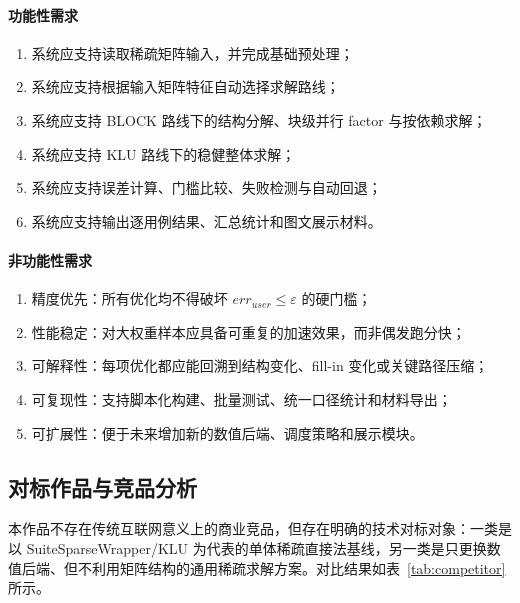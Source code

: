 \documentclass[12pt,a4paper,fontset=none]{ctexart}
\begin{document}
\paragraph{功能性需求}
\begin{enumerate}
  \item 系统应支持读取稀疏矩阵输入，并完成基础预处理；
  \item 系统应支持根据输入矩阵特征自动选择求解路线；
  \item 系统应支持 BLOCK 路线下的结构分解、块级并行 factor 与按依赖求解；
  \item 系统应支持 KLU 路线下的稳健整体求解；
  \item 系统应支持误差计算、门槛比较、失败检测与自动回退；
  \item 系统应支持输出逐用例结果、汇总统计和图文展示材料。
\end{enumerate}

\paragraph{非功能性需求}
\begin{enumerate}
  \item 精度优先：所有优化均不得破坏 $err_{user}\le\varepsilon$ 的硬门槛；
  \item 性能稳定：对大权重样本应具备可重复的加速效果，而非偶发跑分快；
  \item 可解释性：每项优化都应能回溯到结构变化、fill-in 变化或关键路径压缩；
  \item 可复现性：支持脚本化构建、批量测试、统一口径统计和材料导出；
  \item 可扩展性：便于未来增加新的数值后端、调度策略和展示模块。
\end{enumerate}

\subsection{对标作品与竞品分析}

本作品不存在传统互联网意义上的商业竞品，但存在明确的技术对标对象：一类是以 SuiteSparseWrapper/KLU 为代表的单体稀疏直接法基线，另一类是只更换数值后端、但不利用矩阵结构的通用稀疏求解方案。对比结果如表~\ref{tab:competitor} 所示。
\end{document}
